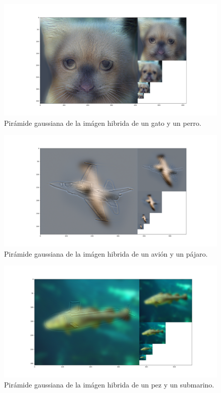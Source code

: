 \documentclass[12pt, spanish]{article}
\begin{document}
\begin{figure}[H]
  \centering
      \includegraphics[width=\textwidth]{hibridas_color/PG-P.png}
 		 \caption{Pirámide gaussiana de la imágen hibrida de un gato y un perro.}
  		\label{fig:ej2al}

\end{figure}


\begin{figure}[H]
  \centering
      \includegraphics[width=\textwidth]{hibridas_color/PA-P.png}
 		 \caption{Pirámide gaussiana de la imágen hibrida de un avión y un pájaro.}
  		\label{fig:ej2al}

\end{figure}

\begin{figure}[H]
  \centering
      \includegraphics[width=\textwidth]{hibridas_color/PP-S.png}
 		 \caption{Pirámide gaussiana de la imágen hibrida de un pez y un submarino.}
  		\label{fig:ej2al}

\end{figure}
\end{document}
